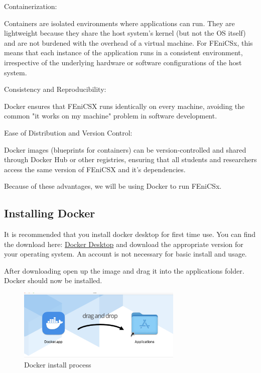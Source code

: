\documentclass[final]{article}
\numberwithin{equation}{section}
\theoremstyle{remarkStyle}
\begin{document}
\begin{outline}
  \1 Containerization:

  \2 Containers are isolated environments where applications can run.
  They are lightweight because they share the host system's kernel (but not the OS itself)
  and are not burdened with the overhead of a virtual machine.
  \2 For FEniCSx, this means that each instance of the application runs in a consistent environment, irrespective of the underlying hardware or software configurations of the host system.


  \1 Consistency and Reproducibility:

  \2 Docker ensures that FEniCSX runs identically on every machine, avoiding the common "it works on my machine" problem in software development.

  \1 Ease of Distribution and Version Control:

  \2 Docker images (blueprints for containers) can be version-controlled and shared through Docker Hub or other registries, ensuring that all students and researchers access the same version of FEniCSX and it's dependencies.



\end{outline}

Because of these advantages, we will be using Docker to run FEniCSx.

\subsection{Installing Docker}
It is recommended that you install docker desktop for first time use. You can find the download here: \href{https://www.docker.com/products/docker-desktop}{Docker Desktop} and download the appropriate version for your operating system.
An account is not necessary for basic install and usage.

After downloading open up the image and drag it into the applications folder. Docker should now be installed.
\begin{figure}[H]
  \centering
  \includegraphics[width=0.7\textwidth]{DockerInstall.png}
  \caption{Docker install process}
\end{figure}
\end{document}
